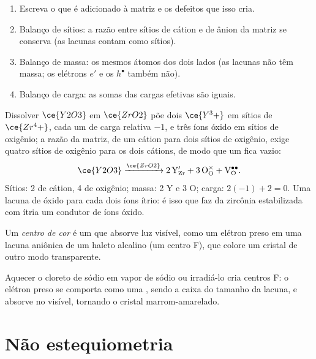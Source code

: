 \begin{method}\label{met:b3:solid-state:kroger-vink}
\begin{enumerate}
  \item Escreva o que é adicionado à matriz e os defeitos que isso cria.
  \item Balanço de sítios: a razão entre sítios de cátion e de ânion da matriz se conserva
        (as lacunas contam como sítios).
  \item Balanço de massa: os mesmos átomos dos dois lados (as lacunas não têm massa;
        os elétrons $e'$ e os  $h^\bullet$ também não).
  \item Balanço de carga: as somas das cargas efetivas são iguais.
\end{enumerate}
\end{method}

\begin{example}
Dissolver $\ce{Y2O3}$ em $\ce{ZrO2}$ põe dois $\ce{Y^3+}$ em sítios de $\ce{Zr^4+}$, cada um de carga relativa $-1$, e
três íons óxido em sítios de oxigênio; a razão da matriz, de um cátion para dois sítios de
oxigênio, exige quatro sítios de oxigênio para os dois cátions, de modo que um fica vazio:
\[
  \ce{Y2O3} \xrightarrow{\ce{ZrO2}} \mathrm{2\,Y_{Zr}' + 3\,O_O^{\times} + V_O^{\bullet\bullet}}.
\]
Sítios: 2 de cátion, 4 de oxigênio; massa: 2 Y e 3 O; carga: $2(-1) + 2 = 0$. Uma lacuna de
óxido para cada dois íons ítrio: é isso que faz da zircônia estabilizada com ítria
um condutor de íons óxido.
\end{example}

\begin{definition}\label{def:b3:solid-state:colour-centre}
Um \emph{centro de cor} é um  que absorve
luz visível, como um elétron preso em uma lacuna aniônica de um haleto
alcalino (um centro F), que colore um cristal de outro modo transparente.
\end{definition}

Aquecer o cloreto de sódio em vapor de sódio ou irradiá-lo cria centros F: o
elétron preso se comporta como uma , sendo a caixa do tamanho da lacuna, e
absorve no visível, tornando o cristal marrom-amarelado.

\section{Não estequiometria}

